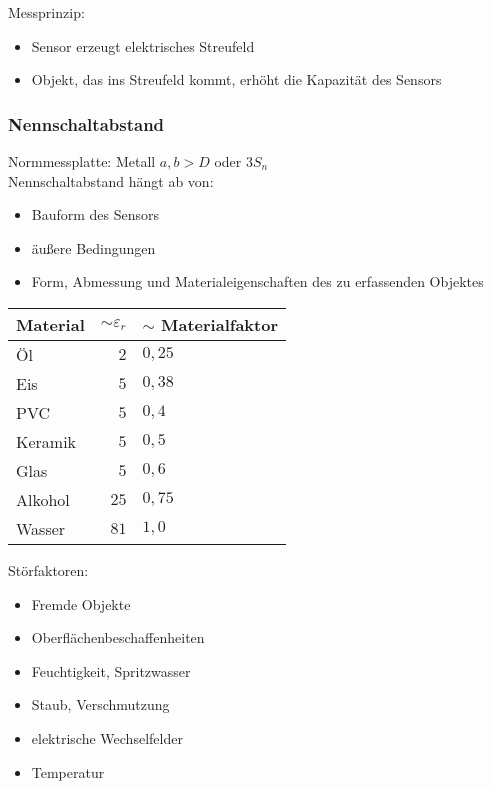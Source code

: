 \documentclass{scrreprt}
\begin{document}
Messprinzip:
\begin{itemize}
\item Sensor erzeugt elektrisches Streufeld
\item Objekt, das ins Streufeld kommt, erhöht die Kapazität des Sensors
\end{itemize}

\subsubsection{Nennschaltabstand}
Normmessplatte: Metall $a,b>D$ oder $3 S_n$\\
Nennschaltabstand hängt ab von:
\begin{itemize}
\item Bauform des Sensors
\item äußere Bedingungen
\item Form, Abmessung und Materialeigenschaften des zu erfassenden Objektes
\end{itemize}
\begin{tabular}{l | r l}
Material & $\sim \varepsilon_r$ & $\sim$ Materialfaktor\\\hline 
Öl & $2$ & $0,25$\\
Eis & $5$ & $0,38$\\
PVC & $5$ & $0,4$\\
Keramik & $5$ & $0,5$\\
Glas & $5$ & $0,6$\\
Alkohol & $25$ & $0,75$\\
Wasser & $81$ & $1,0$
\end{tabular}

Störfaktoren:
\begin{itemize}
\item Fremde Objekte
\item Oberflächenbeschaffenheiten
\item Feuchtigkeit, Spritzwasser
\item Staub, Verschmutzung
\item elektrische Wechselfelder
\item Temperatur
\end{itemize}
\end{document}
